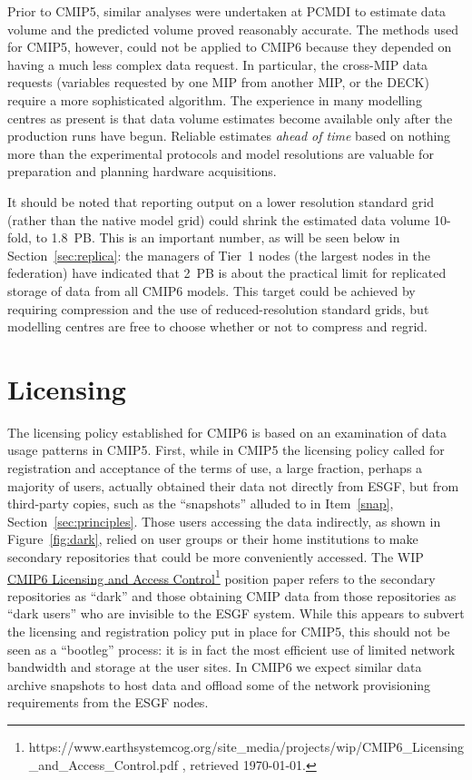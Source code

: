\documentclass[gmd,manuscript]{copernicus}
\begin{document}
Prior to CMIP5, similar analyses were undertaken at PCMDI to estimate
data volume and the predicted volume proved reasonably accurate. The
methods used for CMIP5, however, could not be applied to CMIP6 because
they depended on having a much less complex data request. In
particular, the cross-MIP data requests (variables requested by one
MIP from another MIP, or the DECK) require a more sophisticated
algorithm. The experience in many modelling centres as present is that
data volume estimates become available only after the production runs
have begun. Reliable estimates \emph{ahead of time} based on nothing
more than the experimental protocols and model resolutions are
valuable for preparation and planning hardware acquisitions.

It should be noted that reporting output on a lower resolution
standard grid (rather than the native model grid) could shrink the
estimated data volume 10-fold, to 1.8~PB. This is an important number,
as will be seen below in Section~\ref{sec:replica}: the managers of
Tier~1 nodes (the largest nodes in the federation) have indicated that
2~PB is about the practical limit for replicated storage of data from
all CMIP6 models.
This target could be achieved by requiring compression and the use of 
reduced-resolution standard grids, but modelling centres are free to choose
whether or not to compress and regrid.

\section{Licensing}
\label{sec:licensing}

The licensing policy established for CMIP6 is based on an examination
of data usage patterns in CMIP5. First, while in CMIP5 the licensing
policy called for registration and acceptance of the terms of use, a
large fraction, perhaps a majority of users, actually obtained their
data not directly from ESGF, but from third-party copies, such as the
``snapshots'' alluded to in Item~\ref{snap},
Section~\ref{sec:principles}. Those users accessing the data
indirectly, as shown in Figure~\ref{fig:dark}, relied on user groups
or their home institutions to make secondary repositories that could
be more conveniently accessed. The WIP
\href{https://www.earthsystemcog.org/site_media/projects/wip/CMIP6_Licensing_and_Access_Control.pdf
}{CMIP6 Licensing and Access
  Control}\footnote{https://www.earthsystemcog.org/site\_media/projects/wip/CMIP6\_Licensing\_and\_Access\_Control.pdf
  , retrieved \today.} position paper refers to the secondary
repositories as ``dark'' and those obtaining CMIP data from those
repositories as ``dark users'' who are invisible to the ESGF system.
While this appears to subvert the licensing and registration policy
put in place for CMIP5, this should not be seen as a ``bootleg''
process: it is in fact the most efficient use of limited network
bandwidth and storage at the user sites. In CMIP6 we expect similar
data archive snapshots to host data and offload some of the network
provisioning requirements from the ESGF nodes.
\end{document}
